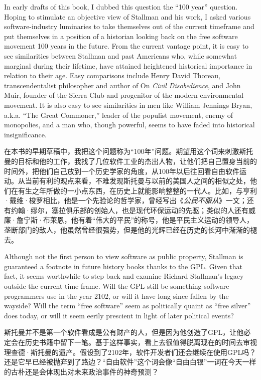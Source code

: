 \ifdefined\eng
In early drafts of this book, I dubbed this question the ``100 year'' question. Hoping to stimulate an objective view of Stallman and his work, I asked various software-industry luminaries to take themselves out of the current timeframe and put themselves in a position of a historian looking back on the free software movement 100 years in the future. From the current vantage point, it is easy to see similarities between Stallman and past Americans who, while somewhat marginal during their lifetime, have attained heightened historical importance in relation to their age. Easy comparisons include Henry David Thoreau, transcendentalist philosopher and author of On \textit{Civil Disobedience}, and John Muir, founder of the Sierra Club and progenitor of the modern environmental movement. It is also easy to see similarities in men like William Jennings Bryan, a.k.a. ``The Great Commoner,'' leader of the populist movement, enemy of monopolies, and a man who, though powerful, seems to have faded into historical insignificance.
\fi

\ifdefined\chs
在本书的早期草稿中，我把这个问题称为``100年''问题。期望用这个词来刺激斯托曼的目标和他的工作，我找了几位软件工业的杰出人物，让他们把自己置身当前的时间外，把他们自己放到一个历史学家的角度，从100年以后往回看自由软件运动。从当前有利的观点来看，不难发现斯托曼与以前的美国人之间的相似之处，他们在有生之年所做的一小点东西，在历史上就能影响整整的一代人。比如，与亨利·戴维·梭罗相比，他是一个先验论的哲学家，曾经写出《\textit{公民不服从}》一文；还有约翰·缪尔，塞拉俱乐部的创始人，也是现代环保运动的先驱；类似的人还有威廉·詹宁斯·布莱恩，他有着``伟大的平民''的称号，他是平民主义运动的领导人，垄断部门的敌人，他虽然曾经很强势，但是他的光辉已经在历史的长河中渐渐的褪去。
\fi

\ifdefined\eng
Although not the first person to view software as public property, Stallman is guaranteed a footnote in future history books thanks to the GPL. Given that fact, it seems worthwhile to step back and examine Richard Stallman's legacy outside the current time frame. Will the GPL still be something software programmers use in the year 2102, or will it have long since fallen by the wayside? Will the term ``free software'' seem as politically quaint as ``free silver'' does today, or will it seem eerily prescient in light of later political events?
\fi

\ifdefined\chs
斯托曼并不是第一个软件看成是公有财产的人，但是因为他创造了GPL，让他必定会在历史书籍中留下一笔。基于这样事实，看上去很值得脱离现在的时间去审视理查德·斯托曼的遗产。假设到了2102年，软件开发者们还会继续在使用GPL吗？还是它早已经被抛弃到了路边？``自由软件''这个词会像``自由白银''一词在今天一样的古朴还是会体现出对未来政治事件的神奇预测？
\fi

